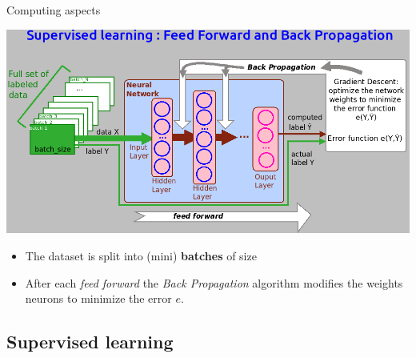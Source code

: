 \documentclass[10pt,serif,mathserif,compress,hyperref={colorlinks}]{beamer}
\begin{document}
\begin{frame}{Computing aspects}

  {\small
    \vspace*{-1mm}\hspace*{-10mm}\includegraphics[width=1.18\textwidth]{./images/NetworkTraining.png}
  \vspace*{-4mm}\begin{itemize}
  \item The dataset is split into (mini) {\bf batches} of size 
  \item After each {\em feed forward} the {\em Back Propagation} algorithm modifies the weights
    neurons to minimize the error $e$.
  \end{itemize}
  }
\end{frame}

\subsection{Supervised learning}
\end{document}
